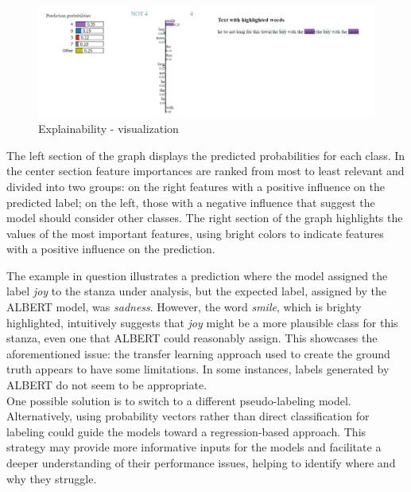 \begin{figure}[H]
    \centering
    \includegraphics[scale= 0.55]{pictures/expl.png}
    \caption{Explainability - visualization}
    \label{fig:expl}
\end{figure}

The left section of the graph displays the
predicted probabilities for each class. In the center section
feature importances are ranked from most to least relevant and divided into two
groups: on the right
features with a positive influence on the predicted label; on the left, those
with a negative influence that suggest the model should consider other classes.
The right section of the graph highlights the values of the most important
features, using bright colors to indicate features with a positive influence on the
prediction.

The example in question illustrates a prediction where the model assigned the label \textit{joy} to the stanza under analysis, but the expected label, assigned by the ALBERT model, was \textit{sadness}.
However, the word \textit{smile}, which is brighty highlighted, intuitively suggests that \textit{joy} might be a more plausible class for this stanza, even one that ALBERT could reasonably assign. 
This showcases the aforementioned issue: the transfer learning approach used to
create the ground truth appears to have some limitations. In some instances, labels
generated by ALBERT do not seem to be appropriate.\\

One possible solution is to switch to a different pseudo-labeling model.
Alternatively, using probability vectors rather than direct classification for
labeling could guide the models toward a regression-based approach. This strategy
may provide more informative inputs for the models and facilitate a deeper
understanding of their performance issues, helping to identify where and why they
struggle.


